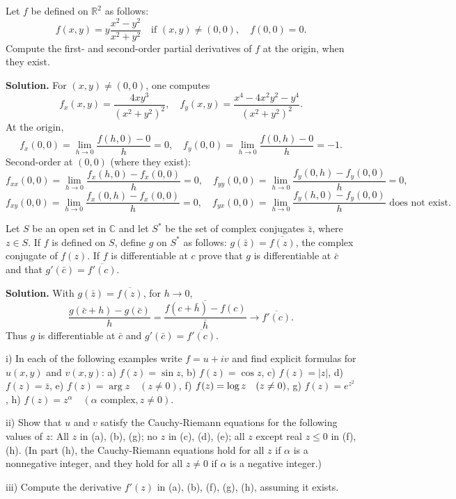 \begin{problembox}
Let \( f \) be defined on \( \mathbb{R}^2 \) as follows:
\[ f(x, y) = y \frac{x^2 - y^2}{x^2 + y^2} \quad \text{if } (x, y) \neq (0, 0), \quad f(0, 0) = 0. \]
Compute the first- and second-order partial derivatives of \( f \) at the origin, when they exist.
\end{problembox}

\noindent\textbf{Solution.}
For $(x,y)\ne(0,0)$, one computes
\[f_x(x,y)=\frac{4xy^3}{(x^2+y^2)^2},\quad f_y(x,y)=\frac{x^4-4x^2y^2-y^4}{(x^2+y^2)^2}.\]
At the origin,
\[f_x(0,0)=\lim_{h\to 0}\frac{f(h,0)-0}{h}=0,\quad f_y(0,0)=\lim_{h\to 0}\frac{f(0,h)-0}{h}=-1.\]
Second-order at $(0,0)$ (where they exist):
\[f_{xx}(0,0)=\lim_{h\to 0}\frac{f_x(h,0)-f_x(0,0)}{h}=0,\quad f_{yy}(0,0)=\lim_{h\to 0}\frac{f_y(0,h)-f_y(0,0)}{h}=0,\]
\[f_{xy}(0,0)=\lim_{h\to 0}\frac{f_x(0,h)-f_x(0,0)}{h}=0,\quad f_{yx}(0,0)=\lim_{h\to 0}\frac{f_y(h,0)-f_y(0,0)}{h}\text{ does not exist}.\]

\begin{problembox}
Let \( S \) be an open set in \( \mathbb{C} \) and let \( S^* \) be the set of complex conjugates \( \bar{z} \), where \( z \in S \). If \( f \) is defined on \( S \), define \( g \) on \( S^* \) as follows: \( g(\bar{z}) = \overline{f(z)} \), the complex conjugate of \( f(z) \). If \( f \) is differentiable at \( c \) prove that \( g \) is differentiable at \( \bar{c} \) and that \( g'(\bar{c}) = \overline{f'(c)} \).
\end{problembox}

\noindent\textbf{Solution.}
With $g(\bar z)=\overline{f(z)}$, for $h\to 0$,
\[\frac{g(\bar c+h)-g(\bar c)}{h}=\overline{\frac{f(c+\bar h)-f(c)}{\bar h}}\to \overline{f'(c)}.\]
Thus $g$ is differentiable at $\bar c$ and $g'(\bar c)=\overline{f'(c)}$.

\begin{problembox}
i) In each of the following examples write \( f = u + iv \) and find explicit formulas for \( u(x, y) \) and \( v(x, y) \):
a) \( f(z) = \sin z \), b) \( f(z) = \cos z \),
c) \( f(z) = |z| \), d) \( f(z) = \bar{z} \),
e) \( f(z) = \arg z \quad (z \neq 0) \), f) \( f(z) = \log z \quad (z \neq 0) \),
g) \( f(z) = e^{z^2} \), h) \( f(z) = z^\alpha \quad (\alpha \text{ complex}, z \neq 0) \).

ii) Show that \( u \) and \( v \) satisfy the Cauchy-Riemann equations for the following values of \( z \): All \( z \) in (a), (b), (g); no \( z \) in (c), (d), (e); all \( z \) except real \( z \leq 0 \) in (f), (h). (In part (h), the Cauchy-Riemann equations hold for all \( z \) if \( \alpha \) is a nonnegative integer, and they hold for all \( z \neq 0 \) if \( \alpha \) is a negative integer.)

iii) Compute the derivative \( f'(z) \) in (a), (b), (f), (g), (h), assuming it exists.
\end{problembox}

